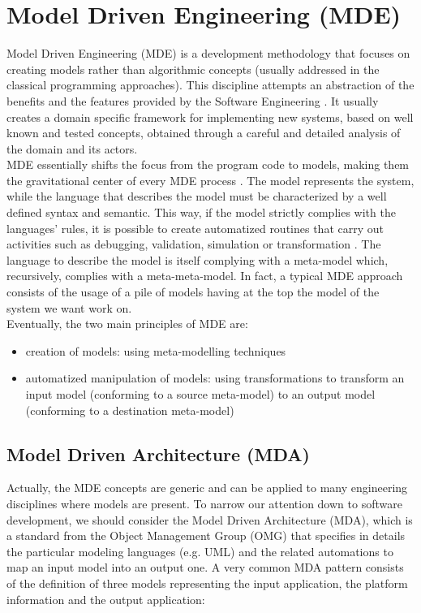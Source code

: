 \section{Model Driven Engineering (MDE)}
\label{ModelDrivenEngineering}
Model Driven Engineering (MDE) is a development methodology that focuses on creating models rather than algorithmic concepts (usually addressed in the classical programming approaches).
This discipline attempts an abstraction of the benefits and the features provided by the Software Engineering \cite{Marrone}. It usually creates a domain specific framework for implementing new systems, based on well known and tested concepts, obtained through a careful and detailed analysis of the domain and its actors.\\
%
MDE essentially shifts the focus from the program code to models, making them the gravitational center of every MDE process \cite{Lukman08}. The model represents the system, while the language that describes the model must be characterized by a well defined syntax and semantic. This way, if the model strictly complies with the languages' rules, it is possible to create automatized routines that carry out activities such as debugging, validation, simulation or transformation \cite{Papa11}. 
The language to describe the model is itself complying with a meta-model which, recursively, complies with a meta-meta-model. In fact, a typical MDE approach consists of the usage of a pile of models having at the top the model of the system we want work on. \\
%
Eventually, the two main principles of MDE are:
\begin{itemize}
 \item creation of models: using meta-modelling techniques
 \item automatized manipulation of models: using transformations to transform an input model (conforming to a source meta-model) to an output model (conforming to a destination meta-model)
\end{itemize}

\subsection{Model Driven Architecture (MDA)}
\label{MDA}
Actually, the MDE concepts are generic and can be applied to many engineering disciplines where models are present. To narrow our attention down to software development, we should consider the Model Driven Architecture (MDA), which is a standard from the Object Management Group (OMG) that specifies in details the particular modeling languages (e.g. UML) and the related automations to map an input model into an output one.
A very common MDA pattern consists of the definition of three models \cite{Marrone} representing the input application, the platform information and the output application:


